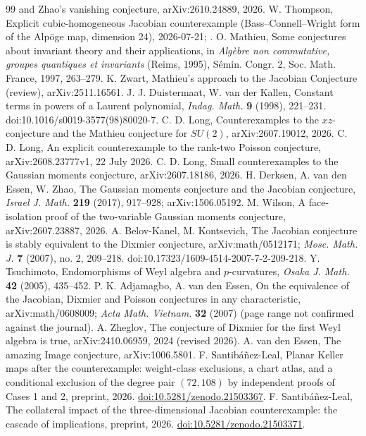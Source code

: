 \documentclass[11pt]{article}
\theoremstyle{definition}
\theoremstyle{remark}
\begin{document}
\begin{thebibliography}{99}
and Zhao's vanishing conjecture, arXiv:2610.24889, 2026.
 W. Thompson, Explicit cubic-homogeneous Jacobian counterexample
(Bass--Connell--Wright form of the Alp\"oge map, dimension 24), 2026-07-21;
.
 O. Mathieu, Some conjectures about invariant theory and their
applications, in \emph{Alg\`ebre non commutative, groupes quantiques et invariants} (Reims,
1995), S\'emin. Congr. 2, Soc. Math. France, 1997, 263--279.
 K. Zwart, Mathieu's approach to the Jacobian Conjecture (review),
arXiv:2511.16561.
 J. J. Duistermaat, W. van der Kallen, Constant terms in powers of a Laurent
polynomial, \emph{Indag. Math.} \textbf{9} (1998), 221--231. doi:10.1016/s0019-3577(98)80020-7.
 C. D. Long, Counterexamples to the $xz$-conjecture and the Mathieu conjecture
for $SU(2)$, arXiv:2607.19012, 2026.
 C. D. Long, An explicit counterexample to the rank-two Poisson conjecture,
arXiv:2608.23777v1, 22 July 2026.
 C. D. Long, Small counterexamples to the Gaussian moments conjecture,
arXiv:2607.18186, 2026.
 H. Derksen, A. van den Essen, W. Zhao, The Gaussian moments conjecture and
the Jacobian conjecture, \emph{Israel J. Math.} \textbf{219} (2017), 917--928; arXiv:1506.05192.
 M. Wilson, A face-isolation proof of the two-variable Gaussian moments
conjecture, arXiv:2607.23887, 2026.
 A. Belov-Kanel, M. Kontsevich, The Jacobian conjecture is stably equivalent
to the Dixmier conjecture, arXiv:math/0512171; \emph{Mosc. Math. J.} \textbf{7} (2007), no. 2, 209--218. doi:10.17323/1609-4514-2007-7-2-209-218.
 Y. Tsuchimoto, Endomorphisms of Weyl algebra and $p$-curvatures,
\emph{Osaka J. Math.} \textbf{42} (2005), 435--452.
 P. K. Adjamagbo, A. van den Essen, On the equivalence of the Jacobian,
Dixmier and Poisson conjectures in any characteristic, arXiv:math/0608009; \emph{Acta Math.
Vietnam.} \textbf{32} (2007) (page range not confirmed against the journal).
 A. Zheglov, The conjecture of Dixmier for the first Weyl algebra is true,
arXiv:2410.06959, 2024 (revised 2026).
 A. van den Essen, The amazing Image conjecture, arXiv:1006.5801.
 F. Santib\'a\~nez-Leal, Planar Keller maps after the counterexample:
weight-class exclusions, a chart atlas, and a conditional exclusion of the degree pair $(72,108)$
by independent proofs of Cases 1 and 2, preprint, 2026.
\href{https://doi.org/10.5281/zenodo.21503367}{doi:10.5281/zenodo.21503367}.
 F. Santib\'a\~nez-Leal, The collateral impact of the three-dimensional
Jacobian counterexample: the cascade of implications, preprint, 2026.
\href{https://doi.org/10.5281/zenodo.21503371}{doi:10.5281/zenodo.21503371}.
\end{thebibliography}
\end{document}

